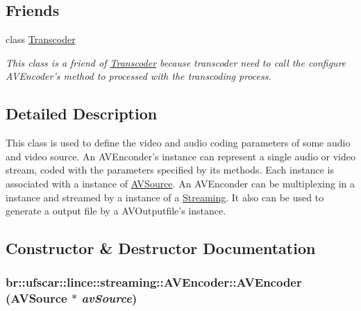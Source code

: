 \subsection*{Friends}
\begin{DoxyCompactItemize}
\item 
class \hyperlink{classbr_1_1ufscar_1_1lince_1_1streaming_1_1AVEncoder_af9f366fbe5cbc06f38791f120c62c182}{Transcoder}
\begin{DoxyCompactList}\small\item\em This class is a friend of \hyperlink{classbr_1_1ufscar_1_1lince_1_1streaming_1_1Transcoder}{Transcoder} because transcoder need to call the configure AVEncoder's method to processed with the transcoding process. \item\end{DoxyCompactList}\end{DoxyCompactItemize}


\subsection{Detailed Description}
This class is used to define the video and audio coding parameters of some audio and video source. An AVEnconder's instance can represent a single audio or video stream, coded with the parameters specified by its methods. Each instance is associated with a instance of \hyperlink{classbr_1_1ufscar_1_1lince_1_1streaming_1_1AVSource}{AVSource}. An AVEnconder can be multiplexing in a instance and streamed by a instance of a \hyperlink{classbr_1_1ufscar_1_1lince_1_1streaming_1_1Streaming}{Streaming}. It also can be used to generate a output file by a AVOutputfile's instance. 

\subsection{Constructor \& Destructor Documentation}
\hypertarget{classbr_1_1ufscar_1_1lince_1_1streaming_1_1AVEncoder_a49570dbdfceb009b74051df252f4dc35}{
\subsubsection[{AVEncoder}]{\setlength{\rightskip}{0pt plus 5cm}br::ufscar::lince::streaming::AVEncoder::AVEncoder ({\bf AVSource} $\ast$ {\em avSource})}}
\label{classbr_1_1ufscar_1_1lince_1_1streaming_1_1AVEncoder_a49570dbdfceb009b74051df252f4dc35}


